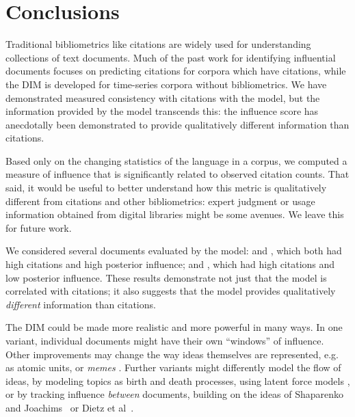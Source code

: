 

\section{Conclusions}

Traditional bibliometrics like citations are widely used for
understanding collections of text documents.  Much of the past work
for identifying influential documents focuses on predicting citations
for corpora which have citations, while the DIM is developed for
time-series corpora without bibliometrics.  We have demonstrated
measured consistency with citations with the model, but the
information provided by the model transcends this: the influence score
has anecdotally been demonstrated to provide qualitatively different
information than citations.

Based only on the changing statistics of the language in a corpus, we
computed a measure of influence that is significantly related to
observed citation counts. That said, it would be useful to better
understand how this metric is qualitatively different from citations
and other bibliometrics: expert judgment or usage information obtained
from digital libraries might be some avenues.  We leave this for
future work.

We considered several documents evaluated by the model:
\cite{brown:1993} and \cite{toole:1984}, which both had high citations
and high posterior influence; and \cite{marcus:1993}, which had high
citations and low posterior influence.
These results demonstrate not just that the model is correlated with
citations; it also suggests that the model provides qualitatively
\emph{different} information than citations.

The DIM could be made more realistic and more powerful in many ways.
In one variant, individual documents might have their own ``windows''
of influence.  Other improvements may change the way ideas themselves
are represented, e.g. as atomic units, or \emph{memes}
\cite{leskovec:2009}.  Further variants might differently model the
flow of ideas, by modeling topics as birth and death processes, using
latent force models \cite{alvarez:2009}, or by tracking influence
\emph{between} documents, building on the ideas of Shaparenko and
Joachims~\cite{shaparenko:2007} or Dietz et
al~\cite{dietz:2007}. %

